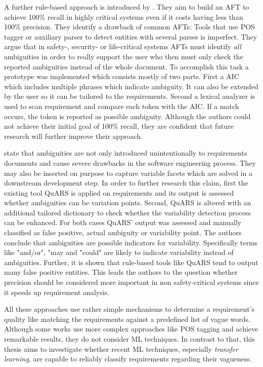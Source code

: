 A further rule-based approach is introduced by \textcite{Tjong:2013}.
They aim to build an \ac{AFT} to achieve 100\% recall in highly critical systems even if it costs having less than 100\% precision.
They identify a drawback of common \acp{AFT}:
Tools that use \ac{POS} tagger or auxiliary parser to detect entities with several parses is imperfect.
They argue that in safety-, security- or life-critical systems \acp{AFT} must identify \textit{all} ambiguities in order to really support the user who then must only check the reported ambiguities instead of the whole document.
To accomplish this task a prototype was implemented which consists mostly of two parts.
First a \ac{AIC} which includes multiple phrases which indicate ambiguity.
It can also be extended by the user so it can be tailored to the requirements.
Second a lexical analyzer is used to scan requirement and compare each token with the \ac{AIC}.
If a match occurs, the token is reported as possible ambiguity.
Although the authors could not achieve their initial goal of 100\% recall, they are confident that future research will further improve their approach.

\textcite{Fantechi:2018} state that ambiguities are not only introduced unintentionally to requirements documents and cause severe drawbacks in the software engineering process.
They may also be inserted on purpose to capture variable facets which are solved in a downstream development step.
In order to further research this claim, first the existing tool \ac{QuARS} \parencite{Fabbrini:2002} is applied on requirements and its output is assessed whether ambiguities can be variation points.
Second, \ac{QuARS} is altered with an additional tailored dictionary to check whether the variability detection process can be enhanced.
For both cases \ac{QuARS}' output was assessed and manually classified as false positive, actual ambiguity or variability point.
The authors conclude that ambiguities are possible indicators for variability.
Specifically terms like "and/or", "may and "could" are likely to indicate variability instead of ambiguities.
Further, it is shown that rule-based tools like \ac{QuARS} tend to output many false positive entities.
This leads the authors to the question whether precision should be considered more important in non safety-critical systems since it speeds up requirement analysis.

All these approaches use rather simple mechanisms to determine a requirement's quality like matching the requirements against a predefined list of vague words.
Although some works use more complex approaches like \ac{POS} tagging and achieve remarkable results, they do not consider \ac{ML} techniques.
In contrast to that, this thesis aims to investigate whether recent \ac{ML} techniques, especially \textit{transfer learning}, are capable to reliably classify requirements regarding their vagueness.
